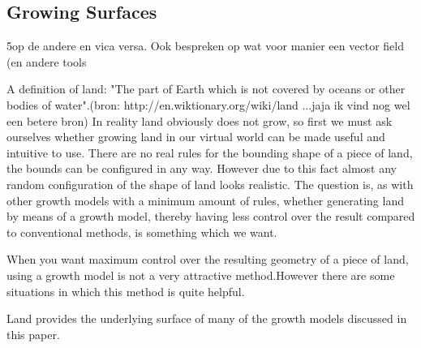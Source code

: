 \documentclass{article}
\newcommand{\inhoud}[1]{\textcolor{blue}{\textbf{\newline Summary: }\it{#1}}}
\begin{document}
\subsection{Growing Surfaces}

5op de andere en vica versa. Ook bespreken op wat voor manier een vector field (en andere tools 


A definition of land: "The part of Earth which is not covered by oceans or other bodies of water".(bron: http://en.wiktionary.org/wiki/land ...jaja ik vind nog wel een betere bron)
In reality land obviously does not grow, so first we must ask ourselves whether growing land in our virtual world can be made useful and intuitive to use. There are no real rules for the bounding shape of a piece of land, the bounds can be configured in any way. However due to this fact almost any random configuration of the shape of land looks realistic. The question is, as with other growth models with a minimum amount of rules, whether generating land by means of a growth model, thereby having less control over the result compared to conventional methods, is something which we want. 

When you want maximum control over the resulting geometry of a piece of land, using a growth model is not a very attractive method.However there are some situations in which this method is quite helpful.


Land provides the underlying surface of many of the growth models discussed in this paper. 

\end{document}
